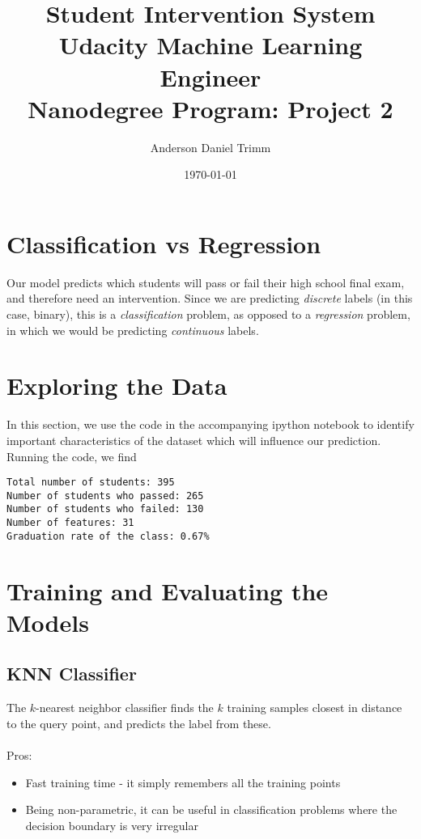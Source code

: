 \documentclass[12 pt]{article}
\numberwithin{equation}{section}
\begin{document}
\title{Student Intervention System \\ \footnotesize{Udacity Machine Learning Engineer \\ Nanodegree Program: Project 2}}
\author{Anderson Daniel Trimm}
\date{\today}
\maketitle

\section{Classification vs Regression}
Our model predicts which students will pass or fail their high school final exam, and therefore need an intervention. Since we are predicting \emph{discrete} labels (in this case, binary), this is a \emph{classification} problem, as opposed to a \emph{regression} problem, in which we would be predicting \emph{continuous} labels.
\section{Exploring the Data}
In this section, we use the code in the accompanying ipython notebook to identify important characteristics of the dataset which will influence our prediction. Running the code, we find

\begin{verbatim}	
Total number of students: 395
Number of students who passed: 265
Number of students who failed: 130
Number of features: 31
Graduation rate of the class: 0.67%
\end{verbatim}

\section{Training and Evaluating the Models}
\subsection{KNN Classifier}
The $k$-nearest neighbor classifier finds the $k$ training samples closest in distance to the query point, and predicts the label from these. \\
\\
Pros:
\begin{itemize}
	\item Fast training time - it simply remembers all the training points
	\item Being non-parametric, it can be useful in classification problems where the decision boundary is very irregular
\end{itemize}
\end{document}
